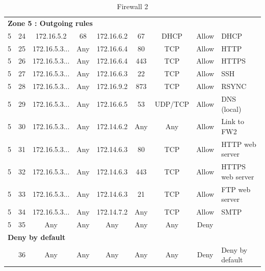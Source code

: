 \documentclass[a4paper,titlepage]{article}
\begin{document}
\begin{table}[h]
\begin{tabular}{c|c|cc|cc|ccl}
		\hline
		\multicolumn{9}{l}{\textbf{Zone 5 : Outgoing rules}}\\
		5 & 24 & 172.16.5.2 & 68 & 172.16.6.2 & 67 & DHCP & Allow & DHCP\\
		5 & 25 & 172.16.5.3... & Any & 172.16.6.4 & 80 & TCP & Allow & HTTP \\
		5 & 26 & 172.16.5.3... & Any & 172.16.6.4 & 443 & TCP & Allow & HTTPS \\
		5 & 27 & 172.16.5.3... & Any & 172.16.6.3 & 22 & TCP & Allow & SSH \\
		5 & 28 & 172.16.5.3... & Any & 172.16.9.2 & 873 & TCP & Allow & RSYNC \\
		5 & 29 & 172.16.5.3... & Any & 172.16.6.5 & 53 & UDP/TCP & Allow & DNS (local) \\
		5 & 30 & 172.16.5.3... & Any & 172.14.6.2 & Any & Any & Allow & Link to FW2 \\
		5 & 31 & 172.16.5.3... & Any & 172.14.6.3 & 80 & TCP & Allow & HTTP web server \\
		5 & 32 & 172.16.5.3... & Any & 172.14.6.3 & 443 & TCP & Allow & HTTPS web server \\
		5 & 33 & 172.16.5.3... & Any & 172.14.6.3 & 21 & TCP & Allow & FTP web server \\
		5 & 34 & 172.16.5.3... & Any & 172.14.7.2 & Any & TCP & Allow & SMTP \\
		5 & 35 & Any & Any & Any & Any & Any & Deny & \\
		\hline
		\multicolumn{9}{l}{\textbf{Deny by default}}\\
		& 36 & Any & Any & Any & Any & Any & Deny & Deny by default\\
		\hline

	\end{tabular}
	\caption{Firewall 2}
\end{table}


\end{document}
